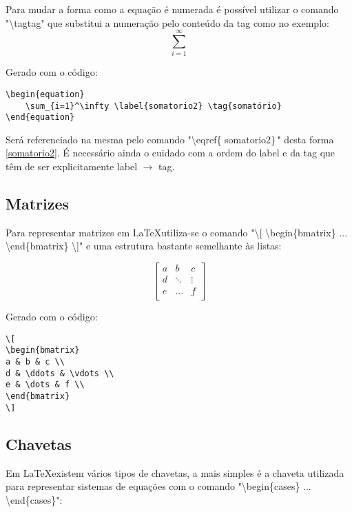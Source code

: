 Para mudar a forma como a equação é numerada é possível utilizar o comando "\textbackslash tag{tag}" que substitui a numeração pelo conteúdo da tag como no exemplo:
\begin{equation}
    \sum_{i=1}^\infty \label{somatorio2} \tag{somatorio}
\end{equation}

Gerado com o código:
\begin{verbatim}
\begin{equation}
    \sum_{i=1}^\infty \label{somatorio2} \tag{somatório}
\end{equation}
\end{verbatim}

Será referenciado na mesma pelo comando "\textbackslash eqref\{ somatorio2\}\," desta forma \eqref{somatorio2}.
É necessário ainda o cuidado com a ordem do label e da tag que têm de ser explicitamente label $\to$ tag.

\subsection{Matrizes}
Para representar matrizes em \LaTeX utiliza-se o comando "\textbackslash [ \textbackslash begin\{bmatrix\} ... \textbackslash end\{bmatrix\} \textbackslash ]" e uma estrutura bastante semelhante às listas:

\[
\begin{bmatrix}
a & b & c \\
d & \ddots & \vdots \\
e & \dots & f \\
\end{bmatrix}
\]

Gerado com o código:
\begin{verbatim}
\[
\begin{bmatrix}
a & b & c \\
d & \ddots & \vdots \\
e & \dots & f \\
\end{bmatrix}
\]
\end{verbatim}

\subsection{Chavetas}
Em \LaTeX existem vários tipos de chavetas, a mais simples é a chaveta utilizada para representar sistemas de equações com o comando "\textbackslash begin\{cases\} ... \textbackslash end\{cases\}":


